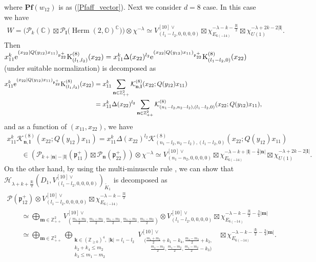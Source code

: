 \documentclass[pdftex]{sigma}
\numberwithin{equation}{section}
\newcommand{\bk}{\mathbf{k}}
\newcommand{\bl}{\mathbf{l}}
\newcommand{\bm}{\mathbf{m}}
\newcommand{\bn}{\mathbf{n}}
\newcommand{\BZ}{\mathbb{Z}}
\newcommand{\BC}{\mathbb{C}}
\newcommand{\BO}{\mathbb{O}}
\newcommand{\fp}{\mathfrak{p}}
\newcommand{\cH}{\mathcal{H}}
\newcommand{\cK}{\mathcal{K}}
\newcommand{\cP}{\mathcal{P}}
\newcommand{\rK}{\mathrm{K}}
\newcommand{\Herm}{\operatorname{Herm}}
\begin{document}
where $\mathbf{Pf}(w_{12})$ is as (\ref{Pfaff_vector}).
Next we consider $d=8$ case. In this case we have
\begin{gather*} W=\big(\cP_k(\BC)\boxtimes\cP_\bl\big(\Herm(2,\BO)^\BC\big)\big)\otimes\chi^{-\lambda}
\simeq V_{(l_1-l_2,0,0,0,0)}^{[10]\vee}
\boxtimes\chi_{E_{6(-14)}}^{-\lambda-k-\frac{|\bl|}{2}}\boxtimes\chi_{U(1)}^{-\lambda+2k-2|\bl|}. \end{gather*}
Then $x_{11}^k{\rm e}^{(x_{22}|Q(y_{12})x_{11})_{\fp^+_{22}}}\rK_{(l_1,l_2)}^{(8)}(x_{22})
=x_{11}^k\Delta(x_{22})^{l_2}{\rm e}^{(x_{22}|Q(y_{12})x_{11})_{\fp^+_{22}}}\rK_{(l_1-l_2,0)}^{(8)}(x_{22})$
(under suitable normalization) is decomposed as
\begin{align*}
x_{11}^k{\rm e}^{(x_{22}|Q(y_{12})x_{11})_{\fp^+_{22}}}\rK_{(l_1,l_2)}^{(8)}(x_{22})
&=x_{11}^k\sum_{\bn\in\BZ_{++}^2}\cK_{\bn,\bl}^{(8)}(x_{22};Q(y_{12})x_{11}) \\
&=x_{11}^k\Delta(x_{22})^{l_2}\sum_{\bn\in\BZ_{++}^2}\cK_{(n_1-l_2,n_2-l_2),(l_1-l_2,0)}^{(8)}(x_{22};Q(y_{12})x_{11}),
\end{align*}
and as a function of $(x_{11},x_{22})$, we have
\begin{gather*}
 x_{11}^k\cK_{\bn,\bl}^{(8)}(x_{22};Q(y_{12})x_{11})
=x_{11}^k\Delta(x_{22})^{l_2}\cK_{(n_1-l_2,n_2-l_2),(l_1-l_2,0)}^{(8)}(x_{22};Q(y_{12})x_{11}) \\
\qquad {} \in (\cP_{k+|\bn|-|\bl|}(\fp^+_{11})\boxtimes\cP_\bn(\fp^+_{22}))\otimes\chi^{-\lambda}
\simeq V_{(n_1-n_2,0,0,0,0)}^{[10]\vee}\boxtimes\chi_{E_{6(-14)}}^{-\lambda-k+|\bl|-\frac{3}{2}|\bn|}
\boxtimes\chi_{U(1)}^{-\lambda+2k-2|\bl|}.
\end{gather*}
On the other hand, by using the multi-minuscule rule \cite[Corollary~2.16]{S}, we can show that
$\cH_{\lambda+k+\frac{|\bl|}{2}}(D_1,V_{(l_1-l_2,0,0,0,0)}^{[10]\vee})_{\tilde{K}_1}$ is decomposed as
\begin{gather*}
 \cP(\fp_{12}^+)\otimes V_{(l_1-l_2,0,0,0,0)}^{[10]\vee}\boxtimes \chi_{E_{6(-14)}}^{-\lambda-k-\frac{|\bl|}{2}} \\
\qquad{} \simeq \bigoplus_{\bm\in\BZ_{++}^2}
V_{\left(\frac{m_1+m_2}{2},\frac{m_1-m_2}{2},\frac{m_1-m_2}{2},\frac{m_1-m_2}{2},\frac{m_1-m_2}{2}\right)}^{[10]\vee}
\otimes V_{(l_1-l_2,0,0,0,0)}^{[10]\vee}\boxtimes \chi_{E_{6(-14)}}^{-\lambda-k-\frac{|\bl|}{2}-\frac{3}{4}|\bm|} \\
\qquad{} \simeq \bigoplus_{\bm\in\BZ_{++}^2}
\bigoplus_{\substack{\bk\in(\BZ_{\ge 0})^4,\; |\bk|=l_1-l_2\\ k_2+k_4\le m_2\\ k_3\le m_1-m_2}}
V_{\substack{\bigl(\frac{m_1+m_2}{2}+k_1-k_4,\frac{m_1-m_2}{2}+k_2, \hspace{10pt} \\
\hspace{15pt} \frac{m_1-m_2}{2},\frac{m_1-m_2}{2},\frac{m_1-m_2}{2}-k_3\bigr)}}^{[10]\vee}
\boxtimes \chi_{E_{6(-14)}}^{-\lambda-k-\frac{|\bl|}{2}-\frac{3}{4}|\bm|}.
\end{gather*}
\end{document}
